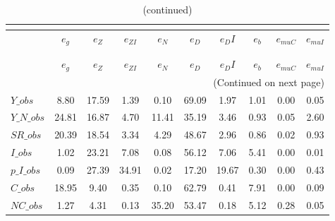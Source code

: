  
\begin{center}
\begin{longtable}{lccccccccc} 
\caption{VARIANCE DECOMPOSITION (in percent)}\\
 \label{Table:th_var_decomp_uncond}\\
\toprule 
$               $	 & 	 $        {e_g}$	 & 	 $        {e_Z}$	 & 	 $     {e_{ZI}}$	 & 	 $        {e_N}$	 & 	 $        {e_D}$	 & 	 $       {e_DI}$	 & 	 $        {e_b}$	 & 	 $    {e_{muC}}$	 & 	 $    {e_{muI}}$\\
\midrule \endfirsthead 
\caption{(continued)}\\
 \toprule \\ 
$               $	 & 	 $        {e_g}$	 & 	 $        {e_Z}$	 & 	 $     {e_{ZI}}$	 & 	 $        {e_N}$	 & 	 $        {e_D}$	 & 	 $       {e_DI}$	 & 	 $        {e_b}$	 & 	 $    {e_{muC}}$	 & 	 $    {e_{muI}}$\\
\midrule \endhead 
\midrule \multicolumn{10}{r}{(Continued on next page)} \\ \bottomrule \endfoot 
\bottomrule \endlastfoot 
$Y\_obs         $	 & 	         8.80	 & 	        17.59	 & 	         1.39	 & 	         0.10	 & 	        69.09	 & 	         1.97	 & 	         1.01	 & 	         0.00	 & 	         0.05 \\ 
$Y\_N\_obs      $	 & 	        24.81	 & 	        16.87	 & 	         4.70	 & 	        11.41	 & 	        35.19	 & 	         3.46	 & 	         0.93	 & 	         0.05	 & 	         2.60 \\ 
$SR\_obs        $	 & 	        20.39	 & 	        18.54	 & 	         3.34	 & 	         4.29	 & 	        48.67	 & 	         2.96	 & 	         0.86	 & 	         0.02	 & 	         0.93 \\ 
$I\_obs         $	 & 	         1.02	 & 	        23.21	 & 	         7.08	 & 	         0.08	 & 	        56.12	 & 	         7.06	 & 	         5.41	 & 	         0.00	 & 	         0.01 \\ 
$p\_I\_obs      $	 & 	         0.09	 & 	        27.39	 & 	        34.91	 & 	         0.02	 & 	        17.20	 & 	        19.67	 & 	         0.30	 & 	         0.00	 & 	         0.43 \\ 
$C\_obs         $	 & 	        18.95	 & 	         9.40	 & 	         0.35	 & 	         0.10	 & 	        62.79	 & 	         0.41	 & 	         7.91	 & 	         0.00	 & 	         0.09 \\ 
$NC\_obs        $	 & 	         1.27	 & 	         4.31	 & 	         0.13	 & 	        35.20	 & 	        53.47	 & 	         0.18	 & 	         5.12	 & 	         0.28	 & 	         0.05 \\ 

\end{longtable}
\end{center}
